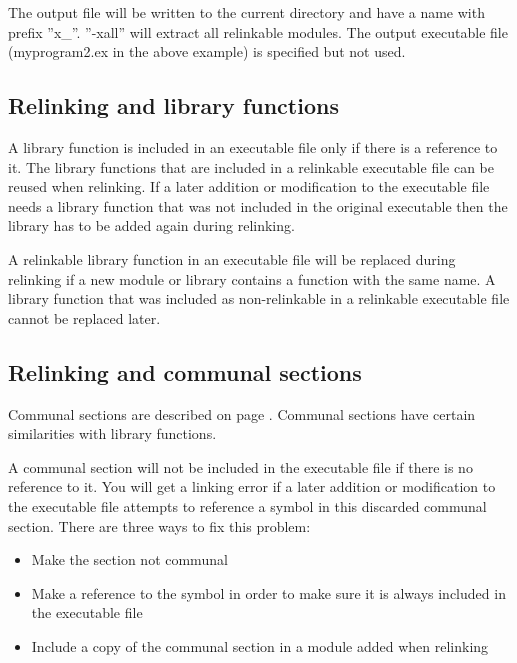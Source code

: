 \documentclass[forwardcom.tex]{subfiles}
\begin{document}
The output file will be written to the current directory and have a name with prefix ''x\_''.
''-xall'' will extract all relinkable modules.
The output executable file (myprogram2.ex in the above example) is specified but not used.
\vspace{2mm}

\subsection{Relinking and library functions} \label{relinkingAndLibraryFunctions}
A library function is included in an executable file only if there is a reference to it. The library functions that are included in a relinkable executable file can be reused when relinking. 
If a later addition or modification to the executable file needs a library function that was not included in the original executable then the library has to be added again during relinking.
\vspace{2mm}

A relinkable library function in an executable file will be replaced during relinking if a new module or library contains a function with the same name. A library function that was included as non-relinkable in a relinkable executable file cannot be replaced later.
\vspace{2mm}


\subsection{Relinking and communal sections} \label{relinkingAndCommunalSections}
Communal sections are described on page \pageref{communal}. Communal sections have certain similarities with library functions.
\vspace{2mm}

A communal section will not be included in the executable file if there is no reference to it.
You will get a linking error if a later addition or modification to the executable file attempts to reference a symbol in this discarded communal section. There are three ways to fix this problem:

\begin{itemize}
\item Make the section not communal
\item Make a reference to the symbol in order to make sure it is always included in the executable file
\item Include a copy of the communal section in a module added when relinking
\end{itemize}
\end{document}
